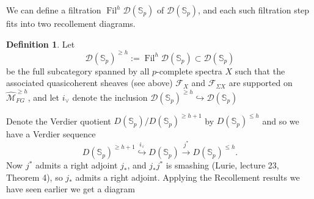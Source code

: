 \documentclass[a4paper]{article} %
\theoremstyle{definition}
\newtheorem{definition}[theorem]{Definition}
\newcommand{\moduliH}{\widehat{\mathcal{M}}_{FG}}
\newcommand{\Spp}{\mathcal{D}(\mathbb{S}_p)}
\begin{document}
We can define a filtration $\operatorname{Fil}^h \Spp$ of $\Spp$, and each such filtration step fits into two recollement diagrams.
\begin{definition}
  Let
  \[
  \Spp^{\ge h} := \operatorname{Fil}^h \Spp \subset \Spp
  \]
  be the full subcategory spanned by all $p$-complete spectra $X$ such that the associated quasicoherent sheaves (see above) $\mathcal{F}_X$ and $\mathcal{F}_{\Sigma X}$ are supported on $\moduliH^{\ge h}$, and let $i_\vee$ denote the inclusion $\Spp^{\ge h} \hookrightarrow \Spp$
\end{definition}
Denote the Verdier quotient $D(\mathbb{S}_p)/D(\mathbb{S}_p)^{\ge h+1}$ by $D(\mathbb{S}_p)^{\le h}$ and so we have a Verdier sequence
\[
D(\mathbb{S}_p)^{\ge h+1} \overset{i_\vee}{\hookrightarrow} D(\mathbb{S}_p) \overset{j^*}{\to} D(\mathbb{S}_p)^{\le h}.
\]
Now $j^*$ admits a right adjoint $j_*$,  and $j_*j^*$ is smashing (Lurie, lecture 23, Theorem 4), so $j_*$ admits a right adjoint.  Applying the Recollement results we have seen earlier we get a diagram
\iffalse
\begin{center}
  \begin{tikzcd}
    X \arrow[dr, shift left=1ex, "i_\vee"] & & \\
    & X \arrow{r} \arrow[ul, shift right=1ex, "i_\vee"] & X \\
    X \arrow{ur} & &
  \end{tikzcd}
\end{center}
\fi
\end{document}
